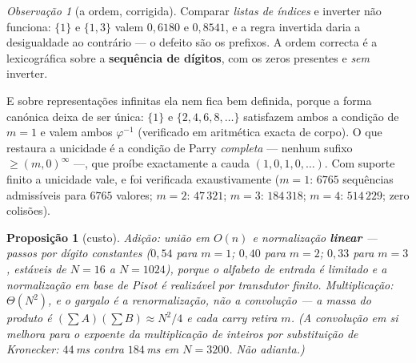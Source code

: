 \documentclass[11pt,a4paper]{article}
\theoremstyle{plain}
\newtheorem{proposicao}[teorema]{Proposição}
\theoremstyle{definition}
\theoremstyle{remark}
\newtheorem{obs}[teorema]{Observação}
\begin{document}
\begin{obs}[a ordem, corrigida]\label{obs:ordemsigma}
Comparar \emph{listas de índices} e inverter não funciona: $\{1\}$ e $\{1,3\}$ valem $0{,}6180$ e
$0{,}8541$, e a regra invertida daria a desigualdade ao contrário --- o defeito são os prefixos. A
ordem correcta é a lexicográfica sobre a \textbf{sequência de dígitos}, com os zeros presentes e
\emph{sem} inverter.

E sobre representações infinitas ela nem fica bem definida, porque a forma canónica deixa de ser
única: $\{1\}$ e $\{2,4,6,8,\dots\}$ satisfazem ambos a condição de $m=1$ e valem ambos
$\varphi^{-1}$ (verificado em aritmética exacta de corpo). O que restaura a unicidade é a condição
de Parry \emph{completa} --- nenhum sufixo $\geq (m,0)^\infty$ ---, que proíbe exactamente a cauda
$(1,0,1,0,\dots)$. Com suporte finito a unicidade vale, e foi verificada exaustivamente
($m=1$: $6765$ sequências admissíveis para $6765$ valores; $m=2$: $47\,321$; $m=3$: $184\,318$;
$m=4$: $514\,229$; zero colisões).
\end{obs}

\begin{proposicao}[custo]\label{prop:custo}
Adição: união em $O(n)$ e normalização \textbf{linear} --- passos por dígito constantes ($0{,}54$
para $m=1$; $0{,}40$ para $m=2$; $0{,}33$ para $m=3$, estáveis de $N=16$ a $N=1024$), porque o
alfabeto de entrada é limitado e a normalização em base de Pisot é realizável por transdutor finito.
Multiplicação: $\Theta(N^2)$, e \emph{o gargalo é a renormalização, não a convolução} --- a massa do
produto é $(\sum A)(\sum B)\approx N^2/4$ e cada \emph{carry} retira $m$. (A convolução em si
melhora para o expoente da multiplicação de inteiros por substituição de Kronecker: $44$\,ms contra
$184$\,ms em $N=3200$. Não adianta.)
\end{proposicao}
\end{document}
